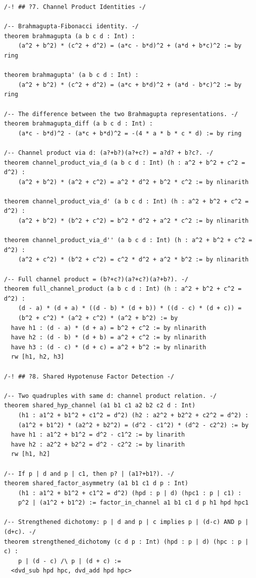 \documentclass[11pt,twoside,openright]{book}
\theoremstyle{definition}
\theoremstyle{remark}
\begin{document}
\begin{lstlisting}[style=lean]
/-! ## ?7. Channel Product Identities -/

/-- Brahmagupta-Fibonacci identity. -/
theorem brahmagupta (a b c d : Int) :
    (a^2 + b^2) * (c^2 + d^2) = (a*c - b*d)^2 + (a*d + b*c)^2 := by ring

theorem brahmagupta' (a b c d : Int) :
    (a^2 + b^2) * (c^2 + d^2) = (a*c + b*d)^2 + (a*d - b*c)^2 := by ring

/-- The difference between the two Brahmagupta representations. -/
theorem brahmagupta_diff (a b c d : Int) :
    (a*c - b*d)^2 - (a*c + b*d)^2 = -(4 * a * b * c * d) := by ring

/-- Channel product via d: (a?+b?)(a?+c?) = a?d? + b?c?. -/
theorem channel_product_via_d (a b c d : Int) (h : a^2 + b^2 + c^2 = d^2) :
    (a^2 + b^2) * (a^2 + c^2) = a^2 * d^2 + b^2 * c^2 := by nlinarith

theorem channel_product_via_d' (a b c d : Int) (h : a^2 + b^2 + c^2 = d^2) :
    (a^2 + b^2) * (b^2 + c^2) = b^2 * d^2 + a^2 * c^2 := by nlinarith

theorem channel_product_via_d'' (a b c d : Int) (h : a^2 + b^2 + c^2 = d^2) :
    (a^2 + c^2) * (b^2 + c^2) = c^2 * d^2 + a^2 * b^2 := by nlinarith

/-- Full channel product = (b?+c?)(a?+c?)(a?+b?). -/
theorem full_channel_product (a b c d : Int) (h : a^2 + b^2 + c^2 = d^2) :
    (d - a) * (d + a) * ((d - b) * (d + b)) * ((d - c) * (d + c)) =
    (b^2 + c^2) * (a^2 + c^2) * (a^2 + b^2) := by
  have h1 : (d - a) * (d + a) = b^2 + c^2 := by nlinarith
  have h2 : (d - b) * (d + b) = a^2 + c^2 := by nlinarith
  have h3 : (d - c) * (d + c) = a^2 + b^2 := by nlinarith
  rw [h1, h2, h3]

/-! ## ?8. Shared Hypotenuse Factor Detection -/

/-- Two quadruples with same d: channel product relation. -/
theorem shared_hyp_channel (a1 b1 c1 a2 b2 c2 d : Int)
    (h1 : a1^2 + b1^2 + c1^2 = d^2) (h2 : a2^2 + b2^2 + c2^2 = d^2) :
    (a1^2 + b1^2) * (a2^2 + b2^2) = (d^2 - c1^2) * (d^2 - c2^2) := by
  have h1 : a1^2 + b1^2 = d^2 - c1^2 := by linarith
  have h2 : a2^2 + b2^2 = d^2 - c2^2 := by linarith
  rw [h1, h2]

/-- If p | d and p | c1, then p? | (a1?+b1?). -/
theorem shared_factor_asymmetry (a1 b1 c1 d p : Int)
    (h1 : a1^2 + b1^2 + c1^2 = d^2) (hpd : p | d) (hpc1 : p | c1) :
    p^2 | (a1^2 + b1^2) := factor_in_channel a1 b1 c1 d p h1 hpd hpc1

/-- Strengthened dichotomy: p | d and p | c implies p | (d-c) AND p | (d+c). -/
theorem strengthened_dichotomy (c d p : Int) (hpd : p | d) (hpc : p | c) :
    p | (d - c) /\ p | (d + c) :=
  <dvd_sub hpd hpc, dvd_add hpd hpc>


\end{lstlisting}
\end{document}
